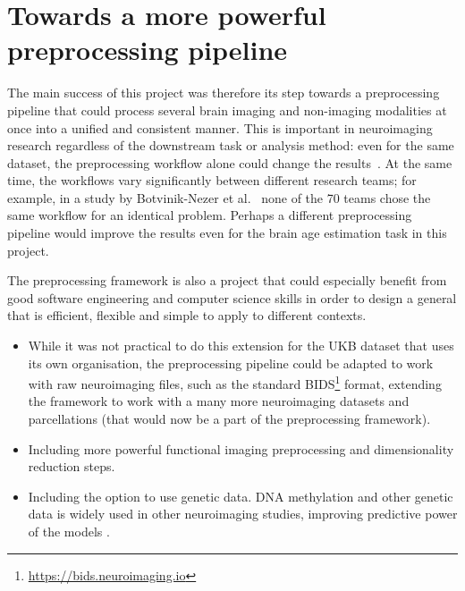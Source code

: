 
\section{Towards a more powerful preprocessing pipeline}
The main success of this project was therefore its step towards a preprocessing pipeline that could process several brain imaging and non-imaging modalities at once into a unified and consistent manner. This is important in neuroimaging research regardless of the downstream task or analysis method: even for the same dataset, the preprocessing workflow alone could change the results~\cite{salehi2020there}. At the same time, the workflows vary significantly between different research teams; for example, in a study by Botvinik-Nezer et al.~\cite{botvinik2019variability} none of the 70 teams chose the same workflow for an identical problem. Perhaps a different preprocessing pipeline would improve the results even for the brain age estimation task in this project.

The preprocessing framework is also a project that could especially benefit from good software engineering and computer science skills in order to design a general that is efficient, flexible and simple to apply to different contexts.
\begin{itemize}
    \item While it was not practical to do this extension for the UKB dataset that uses its own organisation, the preprocessing pipeline could be adapted to work with raw neuroimaging files, such as the standard BIDS\footnote{\url{https://bids.neuroimaging.io}} format, extending the framework to work with a many more neuroimaging datasets and parcellations (that would now be a part of the preprocessing framework).
    \item Including more powerful functional imaging preprocessing and dimensionality reduction steps.
    \item Including the option to use genetic data. DNA methylation and other genetic data is widely used in other neuroimaging studies, improving predictive power of the models \cite{cole2018brain,parisot2018disease}.
\end{itemize}


